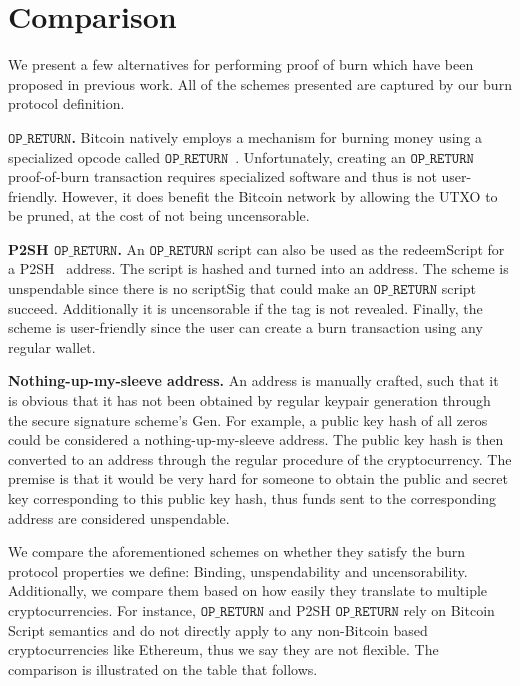 \section{Comparison}

We present a few alternatives for performing proof of burn which have been proposed in previous work. All of the schemes presented are captured by our burn protocol definition.

\newcommand{\opreturn}{\texttt{OP\_RETURN}}

\noindent
\textbf{$\opreturn$.}
Bitcoin natively employs a mechanism for burning money using a specialized
opcode called $\opreturn$~\cite{bartoletti2017analysis}. Unfortunately,
creating an $\opreturn$ proof-of-burn transaction requires specialized software and thus is not
user-friendly. However, it does benefit the Bitcoin network by allowing the UTXO
to be pruned, at the cost of not being uncensorable.

\noindent
\textbf{P2SH $\opreturn$.}
An $\opreturn$ script can also be used as the redeemScript for a P2SH~\cite{p2sh} address. The script is hashed and turned into an address. The scheme is unspendable since there is no scriptSig that could make an $\opreturn$ script succeed. Additionally it is uncensorable if the tag is not revealed. Finally, the scheme is user-friendly since the user can create a burn transaction using any regular wallet.

\noindent
\textbf{Nothing-up-my-sleeve address.}
An address is manually crafted, such that it is obvious that it has not been obtained by regular keypair generation through the secure signature scheme's \textsf{Gen}. For example, a public key hash of all zeros could be considered a nothing-up-my-sleeve address. The public key hash is then converted to an address through the regular procedure of the cryptocurrency. The premise is that it would be very hard for someone to obtain the public and secret key corresponding to this public key hash, thus funds sent to the corresponding address are considered unspendable.

We compare the aforementioned schemes on whether they satisfy the burn protocol properties we define: Binding, unspendability and uncensorability. Additionally, we compare them based on how easily they translate to multiple cryptocurrencies. For instance, $\opreturn$ and P2SH $\opreturn$ rely on Bitcoin Script semantics and do not directly apply to any non-Bitcoin based cryptocurrencies like Ethereum, thus we say they are not flexible. The comparison is illustrated on the table that follows.

